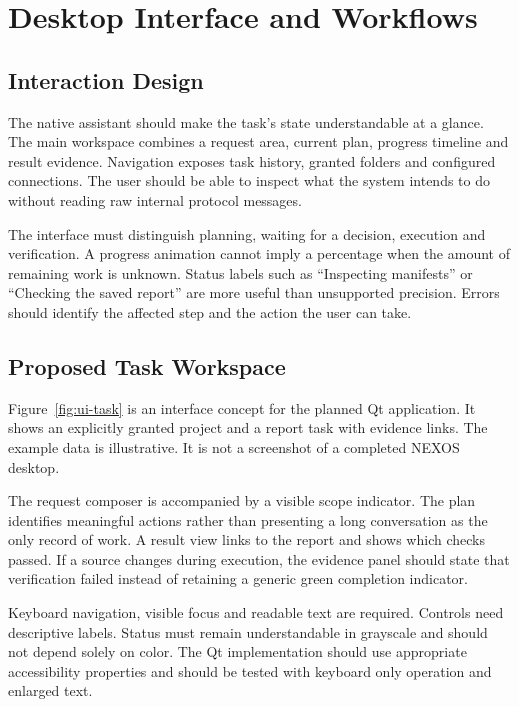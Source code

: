\chapter{Desktop Interface and Workflows}
\section{Interaction Design}
The native assistant should make the task's state understandable at a glance. The main workspace combines a request area, current plan, progress timeline and result evidence. Navigation exposes task history, granted folders and configured connections. The user should be able to inspect what the system intends to do without reading raw internal protocol messages.

The interface must distinguish planning, waiting for a decision, execution and verification. A progress animation cannot imply a percentage when the amount of remaining work is unknown. Status labels such as ``Inspecting manifests'' or ``Checking the saved report'' are more useful than unsupported precision. Errors should identify the affected step and the action the user can take.

\section{Proposed Task Workspace}
Figure~\ref{fig:ui-task} is an interface concept for the planned Qt application. It shows an explicitly granted project and a report task with evidence links. The example data is illustrative. It is not a screenshot of a completed NEXOS desktop.


The request composer is accompanied by a visible scope indicator. The plan identifies meaningful actions rather than presenting a long conversation as the only record of work. A result view links to the report and shows which checks passed. If a source changes during execution, the evidence panel should state that verification failed instead of retaining a generic green completion indicator.

Keyboard navigation, visible focus and readable text are required. Controls need descriptive labels. Status must remain understandable in grayscale and should not depend solely on color. The Qt implementation should use appropriate accessibility properties and should be tested with keyboard only operation and enlarged text.

